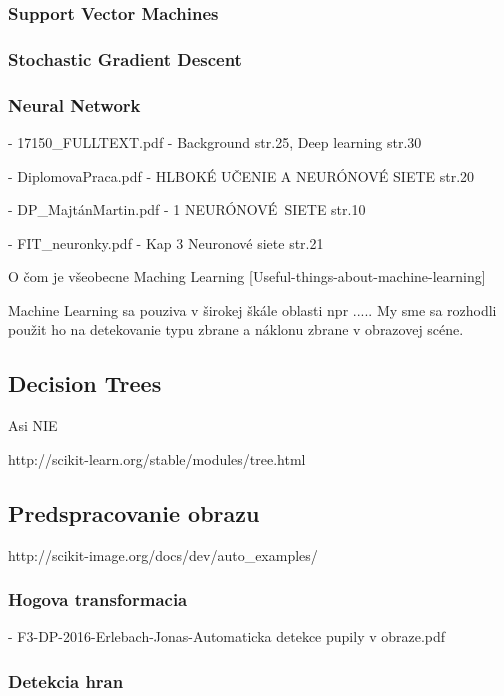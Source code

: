 \documentclass[10pt,a4paper]{article}
\begin{document}
\subsubsection{Support Vector Machines}

\subsubsection{Stochastic Gradient Descent}

\subsubsection{Neural Network}
- 17150\_FULLTEXT.pdf - Background str.25, Deep learning str.30

- DiplomovaPraca.pdf - HLBOKÉ UČENIE A NEURÓNOVÉ SIETE str.20

- DP\_MajtánMartin.pdf - 1 NEURÓNOVÉ\ SIETE str.10

- FIT\_neuronky.pdf - Kap 3 Neuronové siete str.21

O čom je všeobecne Maching Learning
[Useful-things-about-machine-learning]

Machine Learning sa pouziva v širokej škále oblasti npr .....
My sme sa rozhodli použit ho na detekovanie typu zbrane a náklonu zbrane v obrazovej scéne.



\subsection{Decision Trees}
Asi NIE

http://scikit-learn.org/stable/modules/tree.html



\subsection{Predspracovanie obrazu}
http://scikit-image.org/docs/dev/auto\_examples/

\subsubsection{Hogova transformacia}
- F3-DP-2016-Erlebach-Jonas-Automaticka detekce pupily v obraze.pdf

\subsubsection{Detekcia hran}
\end{document}
